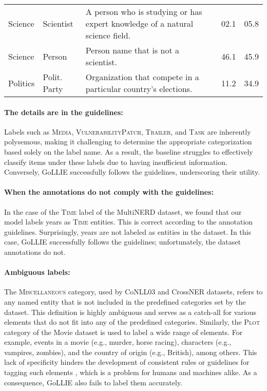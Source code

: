 \begin{table}[!htb]
{\begin{tabular}{@{}llp{7.5cm}cc@{}}
        \rowcolor{Thistle!10} \rule{0pt}{2ex} Science & Scientist & A person who is studying or has expert knowledge of a natural science field.  &  02.1 & 05.8 \\
        \rowcolor{Thistle!10} \rule{0pt}{2ex} Science & Person & Person name that is not a scientist. &   46.1 & 45.9 \\
        \rowcolor{Thistle!10} \rule{0pt}{2ex} Politics & Polit. Party & Organization that compete in a particular country's elections. & 11.2 & 34.9 \\ \bottomrule
    \end{tabular}}
    \label{tab:error_analysis}
\end{table}

\paragraph{The details are in the guidelines:} Labels such as \textsc{Media}, \textsc{VulnerabilityPatch}, \textsc{Trailer}, and \textsc{Task} are inherently polysemous, making it challenging to determine the appropriate categorization based solely on the label name. As a result, the baseline struggles to effectively classify items under these labels due to having insufficient information. Conversely, GoLLIE successfully follows the guidelines, underscoring their utility.

\paragraph{When the annotations do not comply with the guidelines:} In the case of the \textsc{Time} label of the MultiNERD dataset, we found that our model labels years as \textsc{Time} entities. This is correct according to the annotation guidelines. Surprisingly, years are not labeled as entities in the dataset. In this case, GoLLIE successfully follows the guidelines; unfortunately, the dataset annotations do not.

\paragraph{Ambiguous labels:} The \textsc{Miscellaneous} category, used by CoNLL03 and CrossNER datasets, refers to any named entity that is not included in the predefined categories set by the dataset. This definition is highly ambiguous and serves as a catch-all for various elements that do not fit into any of the predefined categories. Similarly,  the \textsc{Plot} category of the Movie dataset is used to label a wide range of elements. For example, events in a movie (e.g., murder, horse racing), characters (e.g., vampires, zombies), and the country of origin (e.g., British), among others. This lack of specificity hinders the development of consistent rules or guidelines for tagging such elements \citep{ratinov-roth-2009-design}, which is a problem for humans and machines alike. As a consequence, GoLLIE also fails to label them accurately. 

